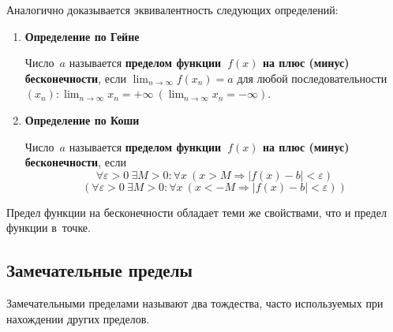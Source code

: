 Аналогично доказывается эквивалентность следующих определений:
\begin{enumerate}
	\item \textbf{Определение по Гейне}
	
	Число~$a$ называется \textbf{пределом функции~$f(x)$ на плюс (минус) бесконечности}, если $\displaystyle \lim_{n \to \infty} f(x_n) = a$ для любой последовательности~$\displaystyle (x_n) \colon \lim_{n \to \infty} x_n = +\infty \ (\lim_{n \to \infty} x_n = -\infty)$.
	
	\item \textbf{Определение по Коши}
	
	Число~$a$ называется \textbf{пределом функции~$f(x)$ на плюс (минус) бесконечности}, если
	\begin{equation*}
	\forall \varepsilon > 0 \ \exists M > 0 \colon \forall x \ (x > M \Rightarrow |f(x) - b| < \varepsilon)
	\end{equation*}
	\begin{equation*}
	(\forall \varepsilon > 0 \ \exists M > 0 \colon \forall x \ (x < -M \Rightarrow |f(x) - b| < \varepsilon))
	\end{equation*}
\end{enumerate}

Предел функции на бесконечности обладает теми же свойствами, что и предел функции в~точке.

\subsection{Замечательные пределы}
Замечательными пределами называют два тождества, часто используемых при нахождении других пределов.

